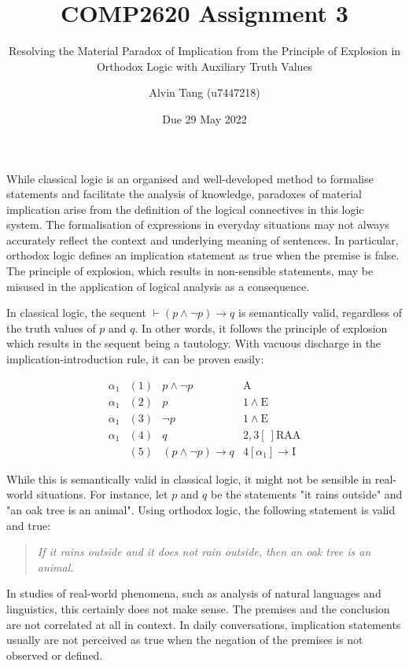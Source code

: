 \documentclass{article}
\title{COMP2620 Assignment 3}
\subtitle {Resolving the Material Paradox of Implication from the Principle of Explosion in Orthodox Logic with Auxiliary Truth Values}
\author{Alvin Tang (u7447218)}
\date{Due 29 May 2022}
\begin{document}
\maketitle

While classical logic is an organised and well-developed method to formalise statements and facilitate the analysis of knowledge, paradoxes of material implication arise from the definition of the logical connectives in this logic system. The formalisation of expressions in everyday situations may not always accurately reflect the context and underlying meaning of sentences. In particular, orthodox logic defines an implication statement as true when the premise is false. The principle of explosion, which results in non-sensible statements, may be misused in the application of logical analysis as a consequence.

\bigskip

In classical logic, the sequent $\vdash (p \land \neg p) \to q$ is semantically valid, regardless of the truth values of $p$ and $q$. In other words, it follows the principle of explosion which results in the sequent being a tautology. With vacuous discharge in the implication-introduction rule, it can be proven easily:

\begin{equation*}
\begin{matrix}
    \alpha_{1} & (1) & p \land \neg p & \text{A}\\
    \alpha_{1} & (2) & p & 1 \land \text{E}\\
    \alpha_{1} & (3) & \neg p & 1 \land \text{E}\\
    \alpha_{1} & (4) & q & 2,3[\ ]\text{RAA}\\
    & (5) & (p \land \neg p) \to q & 4[\alpha_{1}] \to \text{I}
\end{matrix}
\end{equation*}

While this is semantically valid in classical logic, it might not be sensible in real-world situations. For instance, let $p$ and $q$ be the statements "it rains outside" and "an oak tree is an animal". Using orthodox logic, the following statement is valid and true:
\begin{quote}
    \textit{If it rains outside and it does not rain outside, then an oak tree is an animal.}
\end{quote}

In studies of real-world phenomena, such as analysis of natural languages and linguistics{\cite{Stanford}}, this certainly does not make sense. The premises and the conclusion are not correlated at all in context. In daily conversations, implication statements usually are not perceived as true when the negation of the premises is not observed or defined.
\end{document}
